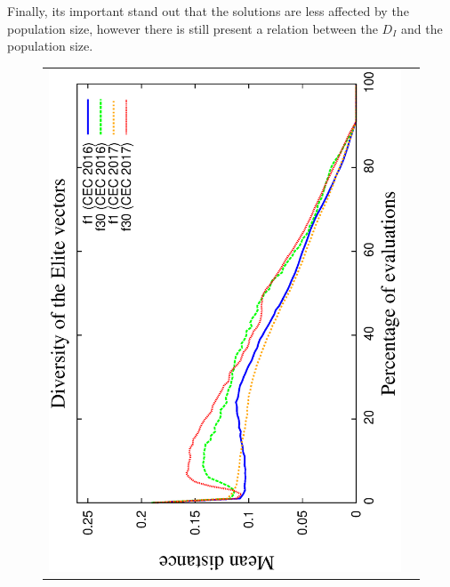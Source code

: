 Finally, its important stand out that the solutions are less affected by the population size, however there is still present a relation between the $D_I$ and the population size.
%
\begin{figure}[t]
\centering
\begin{tabular}{cc}
   \includegraphics[scale=0.25, angle=-90]{img/Diversity_Elite.eps} 

\end{tabular}
\end{figure}
